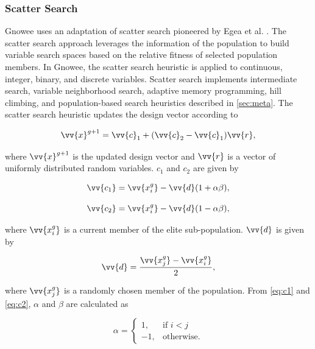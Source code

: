 \documentclass{article}                                                                           %
\begin{document}
\subsubsection{Scatter Search}
Gnowee uses an adaptation of scatter search pioneered by Egea et al. \cite{Egea2010}.
The scatter search approach leverages the information of the population to build variable search spaces based on the relative fitness of selected population members.
In Gnowee, the scatter search heuristic is applied to continuous, integer, binary, and discrete variables.
Scatter search implements intermediate search, variable neighborhood search, adaptive memory programming, hill climbing, and population-based search heuristics described in \autoref{sec:meta}. 
The scatter search heuristic updates the design vector according to 

\begin{equation}
  \vv{x}^{g+1} = \vv{c}_1 + (\vv{c}_2-\vv{c}_1) \vv{r},
\end{equation}

\noindent where $\vv{x}^{g+1}$ is the updated design vector and $\vv{r}$ is a vector of uniformly distributed random variables. 
$c_1$ and $c_2$ are given by

\begin{equation} \label{eq:c1}
  \vv{c_1} = \vv{x^g_i} - \vv{d}(1+\alpha \beta),
\end{equation}

\begin{equation} \label{eq:c2}
  \vv{c_2} = \vv{x^g_i} - \vv{d}(1-\alpha \beta),
\end{equation}

\noindent where $\vv{x^g_i}$ is a current member of the elite sub-population.
$\vv{d}$ is given by

\begin{equation}
  \vv{d} = \frac{\vv{x^g_j} - \vv{x^g_i}}{2},
\end{equation}

\noindent where $\vv{x^g_j}$ is a randomly chosen member of the population.
From \autoref{eq:c1} and \autoref{eq:c2}, $\alpha$ and $\beta$ are calculated as

\begin{equation}
  \alpha = 
    \begin{cases}
      1, & \text{if } i < j \\
      -1, & \text{otherwise.}
    \end{cases}
\end{equation}
\end{document}
